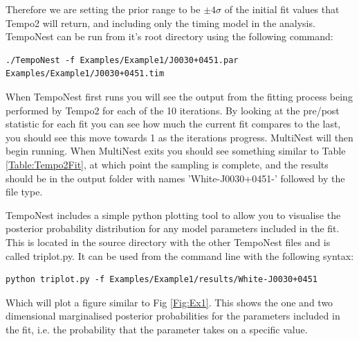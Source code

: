 \documentclass[%
 preprint,
 amsmath,amssymb,amsfonts,
 aps,
]{revtex4-1}
\begin{document}
Therefore we are setting the prior range to be $\pm 4\sigma$ of the initial fit values that Tempo2 will return, and including only the timing model in the analysis.
TempoNest can be run from it's root directory using the following command:
%
\begin{lstlisting}
./TempoNest -f Examples/Example1/J0030+0451.par Examples/Example1/J0030+0451.tim
\end{lstlisting}
%
When TempoNest first runs you will see the output from the fitting process being performed by Tempo2 for each of the 10 iterations.  By looking at the pre/post statistic for each fit you can see how much the current fit compares to the last, you should see this move towards 1 as the iterations progress.   MultiNest will then begin running. When MultiNest exits you should see something similar to Table \ref{Table:Tempo2Fit}, at which point the sampling is complete, and the results should be in the output folder with names 'White-J0030+0451-' followed by the file type.  

TempoNest includes a simple python plotting tool to allow you to visualise the posterior probability distribution for any model parameters included in the fit.  This is located in the source directory with the other TempoNest files and is called triplot.py.  It can be used from the command line with the following syntax:

\begin{lstlisting}
python triplot.py -f Examples/Example1/results/White-J0030+0451
\end{lstlisting}
%
Which will plot a figure similar to Fig \ref{Fig:Ex1}.  This shows the one and two dimensional marginalised posterior probabilities for the parameters included in the fit, i.e. the probability that the parameter takes on a specific value.
\end{document}
